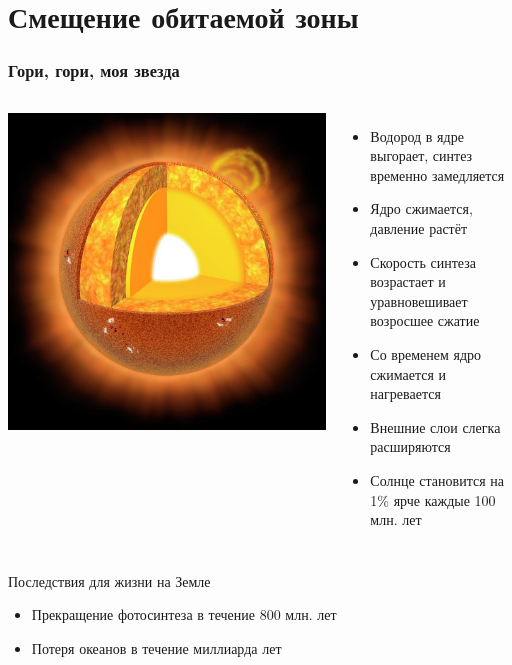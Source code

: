 \documentclass[aspectratio=169]{beamer}
\begin{document}
\section{Смещение обитаемой зоны}
\begin{frame}
\frametitle{Гори, гори, моя звезда}
\begin{columns}[c]
\includegraphics[width=\textwidth]{img/sun_structure.jpg}
\begin{itemize}
\item Водород в ядре выгорает, синтез временно замедляется
\item Ядро сжимается, давление растёт
\item Скорость синтеза возрастает и уравновешивает возросшее сжатие
\item Со временем ядро сжимается и нагревается
\item Внешние слои слегка расширяются
\item Солнце становится на 1\% ярче каждые 100 млн. лет
\end{itemize}
\end{columns}

\begin{block}{Последствия для жизни на Земле}
\begin{itemize}
\item Прекращение фотосинтеза в течение 800 млн. лет
\item Потеря океанов в течение миллиарда лет
\end{itemize}
\end{block}
\end{frame}
\end{document}
